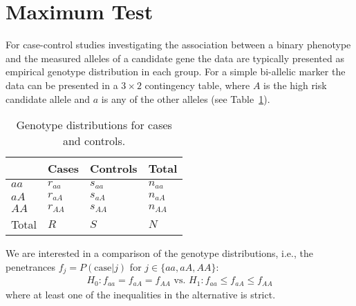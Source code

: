 \documentclass[bimj,fleqn]{w-art}
\begin{document}
\section{Maximum Test}

For case-control studies investigating the association between a binary phenotype 
and the measured alleles of a candidate gene the data are typically 
presented as empirical genotype distribution in each group. 
For a simple bi-allelic marker the data can be 
presented in a $3 \times 2$ contingency table, where $A$ is the 
high risk candidate allele and $a$ is any of the other alleles 
(see Table~\ref{gdistr}). 

\begin{table}
\begin{center}
\caption{Genotype distributions for cases and controls. \label{gdistr}}
\vspace*{0.5cm}
  \begin{tabular}{l l l l}
       & Cases & Controls & Total \\
 \hline
 $aa$       &       $r_{aa}$ & $s_{aa}$ & $n_{aa}$\\
 $aA$       &       $r_{aA}$ & $s_{aA}$ & $n_{aA}$ \\
 $AA$       &       $r_{AA}$ & $s_{AA}$ & $n_{AA}$ \\
 Total&         $R$     & $S$       & $N$  \\
  \hline
 \end{tabular}
\end{center}
 \end{table}


We are interested in a comparison of the genotype distributions, 
i.e., the penetrances $f_j = P(\text{case} | j)$ for $j \in \{aa, aA, AA\}$:
\begin{eqnarray*}
H_0: f_{aa} = f_{aA} = f_{AA} \text{ vs. } H_1: f_{aa} \le f_{aA} \le f_{AA}
\end{eqnarray*}
where at least one of the inequalities in the alternative is strict.
\end{document}
